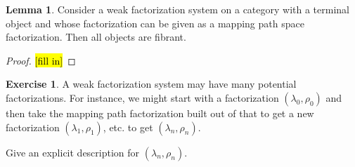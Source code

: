 \documentclass{article}
\theoremstyle{definition}
\newtheorem{lemma}[definition]{Lemma}
\newtheorem{exercise}[definition]{Exercise}
\begin{document}
\begin{lemma}
    Consider a weak factorization system on a category with a terminal object and whose factorization can be given as a mapping path space factorization. Then all objects are fibrant.
\end{lemma}
\begin{proof}
    \hl{[fill in]}
\end{proof}



\begin{exercise}
    A weak factorization system may have many potential factorizations. For instance, we might start with a factorization $(\lambda_0, \rho_0)$ and then take the mapping path factorization built out of that to get a new factorization $(\lambda_1, \rho_1)$, etc. to get $(\lambda_n, \rho_n)$.

    Give an explicit description for $(\lambda_n, \rho_n)$.
\end{exercise}





\end{document}
